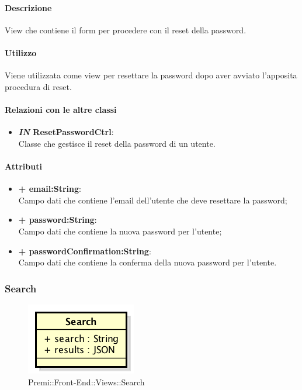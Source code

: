 	\paragraph{Descrizione}
	View che contiene il form per procedere con il reset della password.
	
	\paragraph{Utilizzo}
	Viene utilizzata come view per resettare la password dopo aver avviato l'apposita procedura di reset.
	
	\paragraph{Relazioni con le altre classi}
	\begin{itemize}
		\item \textbf{\textit{IN} ResetPasswordCtrl}:\\
		Classe che gestisce il reset della password di un utente.
	\end{itemize}
	
	\paragraph{Attributi}
	\begin{itemize}
		\item \textbf{+ email:String}: \\
		Campo dati che contiene l'email dell'utente che deve resettare la password;
		\item \textbf{+ password:String}: \\
		Campo dati che contiene la nuova password per l'utente;
		\item \textbf{+ passwordConfirmation:String}: \\
		Campo dati che contiene la conferma della nuova password per l'utente.
	\end{itemize}
	

\subsubsection{Search}
	\begin{figure}[h]
		\centering
		\includegraphics[width=0.3\linewidth]{img/premi_front_end_views_search}
		\caption[Premi::Front-End::Views::Search]{Premi::Front-End::Views::Search}
	\end{figure}
	
